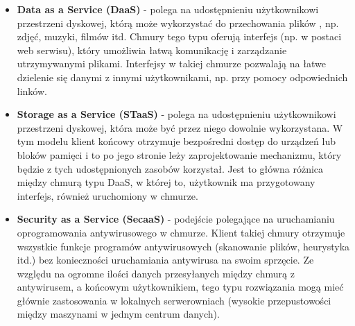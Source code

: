 \documentclass[10pt,a4paper,titlepage,twoside]{report}
\begin{document}
\begin{itemize}
	\item \textbf{Data as a Service (DaaS)} - polega na udostępnieniu użytkownikowi przestrzeni dyskowej, którą może wykorzystać do przechowania plików \cite{ad10}, np. zdjęć, muzyki, filmów itd. Chmury tego typu oferują interfejs (np. w postaci web serwisu), który umożliwia łatwą komunikację i zarządzanie utrzymywanymi plikami. Interfejsy w takiej chmurze pozwalają na łatwe dzielenie się danymi z innymi użytkownikami, np. przy pomocy odpowiednich linków.
	\item \textbf{Storage as a Service (STaaS)} - polega na udostępnieniu użytkownikowi przestrzeni dyskowej, która może być przez niego dowolnie wykorzystana. W tym modelu klient końcowy otrzymuje bezpośredni dostęp do urządzeń lub bloków pamięci i to po jego stronie leży zaprojektowanie mechanizmu, który będzie z tych udostępnionych zasobów korzystał\cite{ad10}. Jest to główna różnica między chmurą typu DaaS, w której to, użytkownik ma przygotowany interfejs, również uruchomiony w chmurze.
	\item \textbf{Security as a Service (SecaaS)} - podejście polegające na uruchamianiu oprogramowania antywirusowego w chmurze. Klient takiej chmury otrzymuje wszystkie funkcje programów antywirusowych (skanowanie plików, heurystyka itd.) bez konieczności uruchamiania antywirusa na swoim sprzęcie. Ze względu na ogromne ilości danych przesyłanych między chmurą z antywirusem, a końcowym użytkownikiem, tego typu rozwiązania mogą mieć głównie zastosowania w lokalnych serwerowniach (wysokie przepustowości między maszynami w jednym centrum danych).
\end{itemize}
\end{document}
